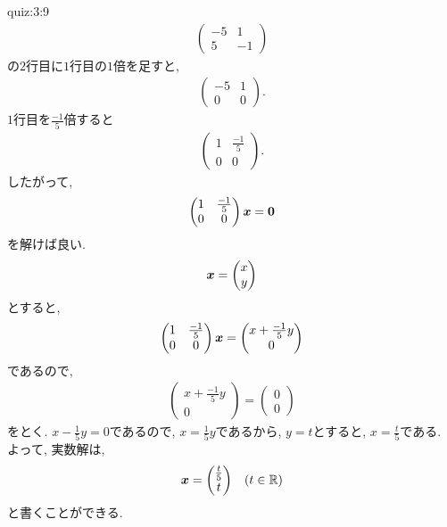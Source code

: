 \begin{answerof}{quiz:3:9} 
  \begin{align*}
    \begin{pmatrix}-5&1\\5&-1\end{pmatrix}
  \end{align*}
  の$2$行目に$1$行目の$1$倍を足すと,
 \begin{align*}
    \begin{pmatrix}-5&1\\0&0\end{pmatrix}.
  \end{align*}
 $1$行目を$\frac{-1}{5}$倍すると
 \begin{align*}
    \begin{pmatrix}1&\frac{-1}{5}\\0&0\end{pmatrix}.
  \end{align*}
 したがって,
  \begin{align*}
    \begin{pmatrix}1&\frac{-1}{5}\\0&0\end{pmatrix}
    \boldsymbol{x}=\boldsymbol{0}
  \end{align*}
  を解けば良い.
  \begin{align*}
    \boldsymbol{x}=
    \begin{pmatrix}x\\y\end{pmatrix}
  \end{align*}
  とすると,
  \begin{align*}
    \begin{pmatrix}1&\frac{-1}{5}\\0&0\end{pmatrix}
      \boldsymbol{x}
      =
    \begin{pmatrix}x+\frac{-1}{5}y\\0\end{pmatrix}
  \end{align*}
  であるので,
  \begin{align*}
    \begin{pmatrix}x+\frac{-1}{5}y\\0\end{pmatrix}=
      \begin{pmatrix}0\\0\end{pmatrix}
  \end{align*}
  をとく. $x-\frac{1}{5}y=0$であるので,
  $x=\frac{1}{5}y$であるから,
  $y=t$とすると, $x=\frac{t}{5}$である.
  よって, 実数解は,
  \begin{align*}
    \boldsymbol{x}=\begin{pmatrix}\frac{t}{5}\\t\end{pmatrix} && (t\in\mathbb{R})
  \end{align*}
  と書くことができる.  
\end{answerof}

